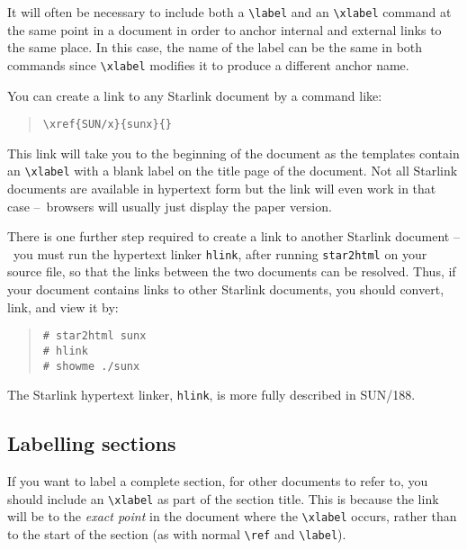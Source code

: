 \documentclass[twoside,11pt]{article}
\newcommand{\xref}[3]{#1}
\newcommand{\xlabel}[1]{}
\renewcommand{\_}{\texttt{\symbol{95}}}
\newcommand{\dash}{--}
\newcommand{\dash}{-}
\begin{document}
It will often be necessary to include both a \verb#\label# and an
\verb#\xlabel# command at the same point in a document in order to anchor
internal and external links to the same place.
In this case, the name of the label can be the same in both commands since
\verb#\xlabel# modifies it to produce a different anchor name.

You can create a link to any Starlink document by a command like:

\begin{quote}
\begin{verbatim}
\xref{SUN/x}{sunx}{}
\end{verbatim}
\end{quote}

This link will take you to the beginning of the document as the templates
contain an \verb#\xlabel# with a blank label on the title page of the document.
Not all Starlink documents are available in hypertext form but the link will
even work in that case \dash\  browsers will usually just display the paper
version.

There is one further step required to create a link to another Starlink
document \dash\ you must run the hypertext linker \texttt{hlink}, after
running \texttt{star2html} on your source file, so that the links between the
two documents can be resolved.
Thus, if your document contains links to other Starlink documents, you
should convert, link, and view it by:

\begin{quote}
\begin{verbatim}
# star2html sunx
# hlink
# showme ./sunx
\end{verbatim}
\end{quote}

The Starlink hypertext linker, \texttt{hlink}, is more fully described in
\xref{SUN/188}{sun188}{}.

\subsection{\xlabel{labelling_sections}\label{labelling_sections}Labelling sections}

If you want to label a complete section, for other documents to refer to,
you should include an \verb+\xlabel+ as part of the section title.
This is because the link will be to the \emph{exact point}\/ in the document
where the \verb#\xlabel# occurs, rather than to the start of the
section (as with normal \verb#\ref# and \verb#\label#).
\end{document}
